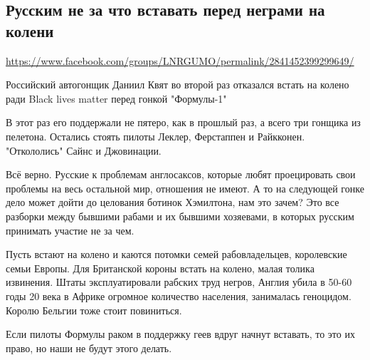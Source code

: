  
 

\subsection{Русским не за что вставать перед неграми на колени}
\label{sec:13_07_2020.fb.lnr.1}
\url{https://www.facebook.com/groups/LNRGUMO/permalink/2841452399299649/}

Российский автогонщик Даниил Квят во второй раз отказался встать на колено ради
Black lives matter перед гонкой "Формулы-1"

В этот раз его поддержали не пятеро, как в прошлый раз, а всего три гонщика из
пелетона. Остались стоять пилоты Леклер, Ферстаппен и Райкконен. "Откололись"
Сайнс и Джовинации.

Всё верно. Русские к проблемам англосаксов, которые любят проецировать свои
проблемы на весь остальной мир, отношения не имеют. А то на следующей гонке
дело может дойти до целования ботинок Хэмилтона, нам это зачем? Это все
разборки между бывшими рабами и их бывшими хозяевами, в которых русским
принимать участие не за чем.

Пусть встают на колено и каются потомки семей рабовладельцев, королевские семьи
Европы. Для Британской короны встать на колено, малая толика извинения. Штаты
эксплуатировали рабских труд негров, Англия убила в 50-60 годы 20 века в Африке
огромное количество населения, занималась геноцидом. Королю Бельгии тоже стоит
повиниться.

Если пилоты Формулы раком в поддержку геев вдруг начнут вставать, то это их
право, но наши не будут этого делать.
